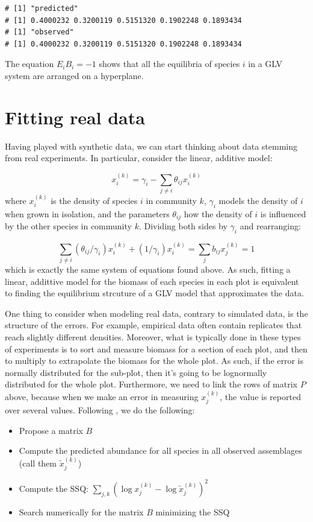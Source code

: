 \documentclass[]{book}
\providecommand{\tightlist}{%
  \setlength{\itemsep}{0pt}\setlength{\parskip}{0pt}}
\begin{document}
\begin{verbatim}
# [1] "predicted"
# [1] 0.4000232 0.3200119 0.5151320 0.1902248 0.1893434
# [1] "observed"
# [1] 0.4000232 0.3200119 0.5151320 0.1902248 0.1893434
\end{verbatim}

The equation \(E_i B_i = -1\) shows that all the equilibria of species \(i\) in a GLV system are arranged on a hyperplane.

\hypertarget{fitting-real-data}{%
\section{Fitting real data}\label{fitting-real-data}}

Having played with synthetic data, we can start thinking about data stemming from real experiments. In particular, consider the linear, additive model:

\[
x_i^{(k)} = \gamma_i - \sum_{j\neq i} \theta_{ij} x_i^{(k)}
\]
where \(x_i^{(k)}\) is the density of species \(i\) in community \(k\), \(\gamma_i\) models the density of \(i\) when grown in isolation, and the parameters \(\theta_{ij}\) how the density of \(i\) is influenced by the other species in community \(k\). Dividing both sides by \(\gamma_i\) and rearranging:

\[
\sum_{j\neq i} (\theta_{ij} /\gamma_i) x_i^{(k)} + (1/{\gamma_i}) x_i^{(k)}= \sum_j b_{ij} x_j^{(k)} = 1
\]
which is exactly the same system of equations found above. As such, fitting a linear, addittive model for the biomass of each species in each plot is equivalent to finding the equilibrium strcuture of a GLV model that approximates the data.

One thing to consider when modeling real data, contrary to simulated data, is the structure of the errors. For example, empirical data often contain replicates that reach slightly different densities. Moreover, what is typically done in these types of experiments is to sort and measure biomass for a section of each plot, and then to multiply to extrapolate the biomass for the whole plot. As such, if the error is normally distributed for the sub-plot, then it's going to be lognormally distributed for the whole plot. Furthermore, we need to link the rows of matrix \(P\) above, because when we make an error in measuring \(x_j^{(k)}\), the value is reported over several values. Following \citet{maynard2019predicting}, we do the following:

\begin{itemize}
\tightlist
\item
  Propose a matrix \(B\)
\item
  Compute the predicted abundance for all species in all observed assemblages (call them \(\tilde{x}_j^{(k)}\))
\item
  Compute the SSQ: \(\sum_{j, k} (\log x_j^{(k)} - \log \tilde{x}_j^{(k)})^2\)
\item
  Search numerically for the matrix \(B\) minimizing the SSQ
\end{itemize}
\end{document}
